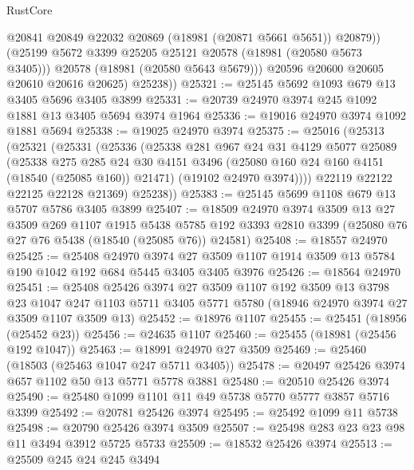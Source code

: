\begin{lexlean}{RustCore}
\begin{coremodule}
                @20841
                @20849
                @22032
                @20869
                (@18981 (@20871 @5661 @5651))
                @20879))
            (@25199 @5672 @3399 @25205 @25121 @20578 (@18981 (@20580 @5673 @3405)))
            @20578
            (@18981 (@20580 @5643 @5679)))
          @20596
          @20600
          @20605
          @20610
          @20616
          @20625)
        @25238))
@25321 := @25145 @5692 @1093 @679 @13 @3405 @5696 @3405 @3899
@25331 := @20739 @24970 @3974 @245 @1092 @1881 @13 @3405 @5694 @3974 @1964
@25336 := @19016 @24970 @3974 @1092 @1881 @5694
@25338 := @19025 @24970 @3974
@25375 := @25016
    (@25313
      (@25321
        (@25331
          (@25336
            (@25338
              @281
              @967
              @24
              @31
              @4129
              @5077
              @25089
              (@25338
                @275
                @285
                @24
                @30
                @4151
                @3496
                (@25080 @160 @24 @160 @4151 (@18540 (@25085 @160)) @21471)
                (@19102 @24970 @3974))))
          @22119
          @22122
          @22125
          @22128
          @21369)
        @25238))
@25383 := @25145 @5699 @1108 @679 @13 @5707 @5786 @3405 @3899
@25407 := @18509
    @24970
    @3974
    @3509
    @13
    @27
    @3509
    @269
    @1107
    @1915
    @5438
    @5785
    @192
    @3393
    @2810
    @3399
    (@25080 @76 @27 @76 @5438 (@18540 (@25085 @76)) @24581)
@25408 := @18557 @24970
@25425 := @25408
    @24970
    @3974
    @27
    @3509
    @1107
    @1914
    @3509
    @13
    @5784
    @190
    @1042
    @192
    @684
    @5445
    @3405
    @3405
    @3976
@25426 := @18564 @24970
@25451 := @25408
    @25426
    @3974
    @27
    @3509
    @1107
    @192
    @3509
    @13
    @3798
    @23
    @1047
    @247
    @1103
    @5711
    @3405
    @5771
    @5780
    (@18946 @24970 @3974 @27 @3509 @1107 @3509 @13)
@25452 := @18976 @1107
@25455 := @25451 (@18956 (@25452 @23))
@25456 := @24635 @1107
@25460 := @25455 (@18981 (@25456 @192 @1047))
@25463 := @18991 @24970 @27 @3509
@25469 := @25460 (@18503 (@25463 @1047 @247 @5711 @3405))
@25478 := @20497 @25426 @3974 @657 @1102 @50 @13 @5771 @5778 @3881
@25480 := @20510 @25426 @3974
@25490 := @25480 @1099 @1101 @11 @49 @5738 @5770 @5777 @3857 @5716 @3399
@25492 := @20781 @25426 @3974
@25495 := @25492 @1099 @11 @5738
@25498 := @20790 @25426 @3974 @3509
@25507 := @25498 @283 @23 @23 @98 @11 @3494 @3912 @5725 @5733
@25509 := @18532 @25426 @3974
@25513 := @25509 @245 @24 @245 @3494

\end{coremodule}
\end{lexlean}
